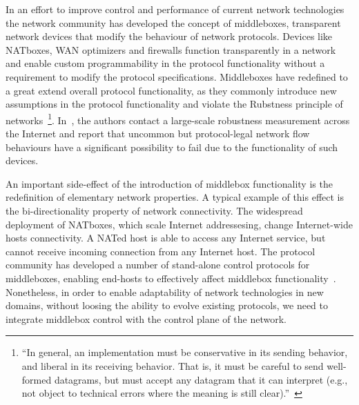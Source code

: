 In an effort to improve control and performance of current network technologies
the network community has developed the concept of middleboxes, transparent
network devices that modify the behaviour of network protocols. Devices like
NATboxes, WAN optimizers and firewalls function transparently in a network and
enable custom programmability in the protocol functionality without a
requirement to modify the protocol specifications.  Middleboxes have redefined
to a great extend overall protocol functionality, as they commonly introduce new
assumptions in the protocol functionality and violate the Rubstness principle of
networks~\footnote{``In general, an implementation must be conservative in its
  sending behavior, and liberal in its receiving behavior.  That is, it must be
  careful to send well-formed datagrams, but must accept any datagram that it
  can interpret (e.g., not object to technical errors where the meaning is still
  clear).''~\cite{RFC0791}}. In~\cite{Honda:2011ci}, the authors contact a
large-scale robustness measurement across the Internet and report that uncommon
but protocol-legal network flow behaviours have a significant possibility to
fail due to the functionality of such devices. 

An important side-effect of the introduction of middlebox functionality is the
redefinition of elementary network properties.  A typical example of this effect
is the bi-directionality property of network connectivity. The widespread
deployment of NATboxes, which scale Internet addressesing, change Internet-wide
hosts connectivity.  A NATed host is able to access any Internet service, but
cannot receive incoming connection from any Internet host. The protocol
community has developed a number of stand-alone control protocols for
middleboxes, enabling end-hosts to effectively affect middlebox
functionality~\cite{eggert08}. Nonetheless, in order to enable adaptability of
network technologies in new domains, without loosing the ability to evolve
existing protocols, we need to integrate middlebox control with the control
plane of the network. 


